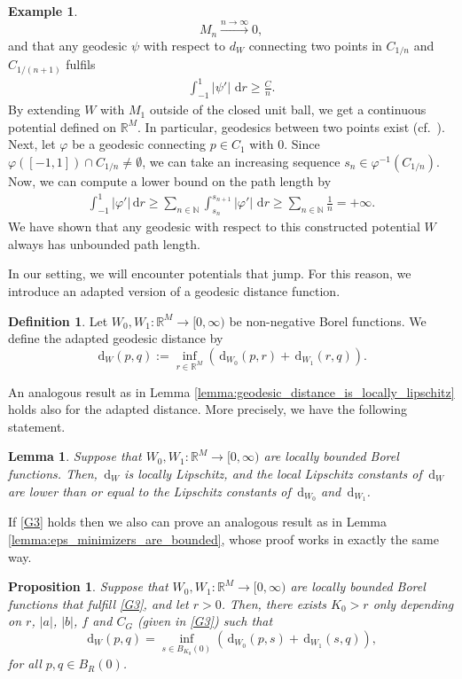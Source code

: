 \documentclass[a4paper, 11pt, reqno]{amsart}
\theoremstyle{plain}
\newtheorem{lemma}[theorem]{Lemma}
\newtheorem{proposition}[theorem]{Proposition}
\theoremstyle{definition}
\newtheorem{definition}[theorem]{Definition}
\newtheorem{example}[theorem]{Example}
\theoremstyle{remark}
\newcommand{\N}{\mathbb N}
\newcommand{\R}{\mathbb R}
\newcommand{\dd}{\,\mathrm{d}}
\begin{document}
\begin{example}
$$  
    M_n \xrightarrow{n \to \infty} 0,
$$ 
and that any geodesic $\psi$ with respect to $d_W$ connecting two points in $C_{1/n}$ and $C_{1/(n+1)}$ fulfils
\begin{align}\label{eq:piecewise_lower_bound_pathlength}
    \int_{-1}^1 |\psi'| \, \dd r \geq \frac{C}{n}.
\end{align}
By extending $W$ with $M_1$ outside of the closed unit ball, we get a continuous potential defined on $\R^M$. In particular, geodesics between two points exist (cf.\ \cite{ZunSter}). 
Next, let $\varphi$ be a geodesic connecting $p \in C_1$ with $0$. Since $\varphi([-1,1]) \cap C_{1/n} \neq \emptyset$, we can take an increasing sequence $s_n \in \varphi^{-1}(C_{1/n})$. Now, we can compute a lower bound on the path length by 
\begin{align*}
    \int_{-1}^1 |\varphi'| \dd r \geq \sum_{n \in \N} \int_{s_n}^{s_{n+1}} |\varphi'| \, \dd r \geq  
    \sum_{n \in \N} \frac 1 n = +\infty.
\end{align*}
We have shown that any geodesic with respect to this constructed potential $W$ always has unbounded path length.
\end{example}
In our setting, we will encounter potentials that jump. For this reason, we introduce an adapted version of a geodesic distance function.
\begin{definition}
    Let $W_0, W_1: \R^M \to [0, \infty)$ be non-negative Borel functions. We define the adapted geodesic distance by
    \[
        \dd_W(p,q) := \inf_{r \in \R^M} (\dd_{W_0}(p, r) + \dd_{W_1}(r, q)).
    \]
\end{definition}

An analogous result as in Lemma \ref{lemma:geodesic_distance_is_locally_lipschitz} holds also for the adapted distance. More precisely, we have the following statement.
\begin{lemma}\label{lemma:adapted_geodesic_distance_is_locally_lipschitz}
    Suppose that $W_0, W_1: \R^M \to [0,\infty)$ are locally bounded Borel functions. Then, $\dd_W$ is locally Lipschitz, and the local Lipschitz constants of $\dd_W$ are lower than or equal to the Lipschitz constants of $\dd_{W_0}$ and $\dd_{W_1}$.
\end{lemma}

If \ref{G3} holds then we also can prove an analogous result as in Lemma \ref{lemma:eps_minimizers_are_bounded}, whose proof works in exactly the same way. 
\begin{proposition}\label{prop:infimum_attained_in_ball}
    Suppose that $W_0, W_1: \R^M \to [0,\infty)$ are locally bounded Borel functions that fulfill \ref{G3}, and let $r > 0$. Then, there exists $K_0 > r$ only depending on $r$,  $|a|$, $|b|$, $f$ and $C_G$ (given in \ref{G3}) such that 
    \[
        \dd_W(p,q) = \inf_{s \in B_{K_0}(0)} (\dd_{W_0}(p, s) + \dd_{W_1}(s, q)),
    \]
    for all $p, q \in B_R(0)$. 
\end{proposition}
\end{document}
